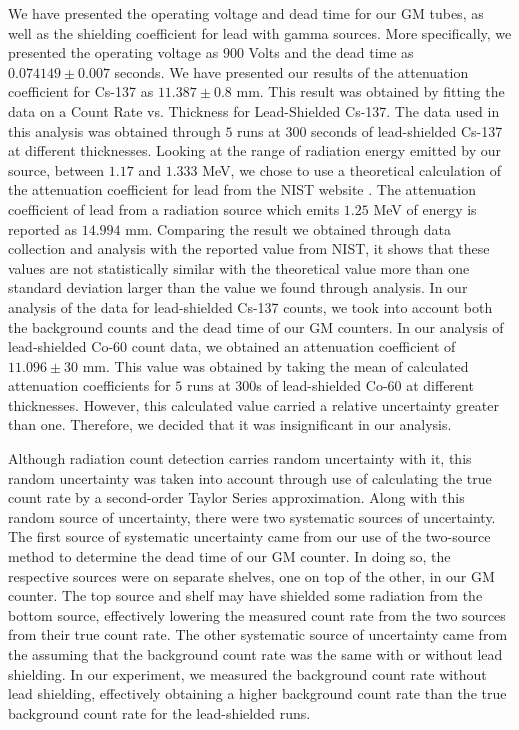 \par We have presented the operating voltage and dead time for our GM tubes, as well as the shielding coefficient for lead with gamma sources. More specifically, we presented the operating voltage as $900$ Volts and the dead time as $0.074149 \pm 0.007$ seconds. We have presented our results of the attenuation coefficient for Cs-137 as $11.387 \pm 0.8$ mm. This result was obtained by fitting the data on a Count Rate vs. Thickness for Lead-Shielded Cs-137. The data used in this analysis was obtained through $5$ runs at $300$ seconds of lead-shielded Cs-137 at different thicknesses. Looking at the range of radiation energy emitted by our source, between $1.17$ and $1.333$ MeV, we chose to use a theoretical calculation of the attenuation coefficient for lead from the NIST website \cite{Shielding}. The attenuation coefficient of lead from a radiation source which emits $1.25$ MeV of energy is reported as $14.994$ mm. Comparing the result we obtained through data collection and analysis with the reported value from NIST, it shows that these values are not statistically similar with the theoretical value more than one standard deviation larger than the value we found through analysis. In our analysis of the data for lead-shielded Cs-137 counts, we took into account both the background counts and the dead time of our GM counters. In our analysis of lead-shielded Co-60 count data, we obtained an attenuation coefficient of $11.096 \pm 30$ mm. This value was obtained by taking the mean of calculated attenuation coefficients for $5$ runs at $300$s of lead-shielded Co-60 at different thicknesses. However, this calculated value carried a relative uncertainty greater than one. Therefore, we decided that it was insignificant in our analysis.
\par Although radiation count detection carries random uncertainty with it, this random uncertainty was taken into account through use of calculating the true count rate by a second-order Taylor Series approximation. Along with this random source of uncertainty, there were two systematic sources of uncertainty. The first source of systematic uncertainty came from our use of the two-source method to determine the dead time of our GM counter. In doing so, the respective sources were on separate shelves, one on top of the other, in our GM counter. The top source and shelf may have shielded some radiation from the bottom source, effectively lowering the measured count rate from the two sources from their true count rate. The other systematic source of uncertainty came from the assuming that the background count rate was the same with or without lead shielding. In our experiment, we measured the background count rate without lead shielding, effectively obtaining a higher background count rate than the true background count rate for the lead-shielded runs. 